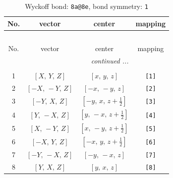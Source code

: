 \documentclass[fleqn,8pt]{jsarticle}
\begin{document}
\begin{longtable}{cccc}
\caption{Wyckoff bond: {\tt 8a@8e}, bond symmetry: {\tt 1}}
 \\
 \hline \hline
No. & vector & center & mapping \\ \hline \endfirsthead

\multicolumn{3}{l}{\tablename\ \thetable{}} \\
 \hline \hline
No. & vector & center & mapping \\ \hline \endhead

 \hline \hline
\multicolumn{3}{r}{\footnotesize\it continued ...} \\ \endfoot

 \hline \hline
\multicolumn{3}{r}{} \\ \endlastfoot

1 & $\left[ X,\, Y,\, Z \right]$ & $\left[ x,\, y,\, z \right]$ & {\tt [1]} \\ \hline
2 & $\left[ - X,\, - Y,\, Z \right]$ & $\left[ - x,\, - y,\, z \right]$ & {\tt [2]} \\ \hline
3 & $\left[ - Y,\, X,\, Z \right]$ & $\left[ - y,\, x,\, z + \frac{1}{2} \right]$ & {\tt [3]} \\ \hline
4 & $\left[ Y,\, - X,\, Z \right]$ & $\left[ y,\, - x,\, z + \frac{1}{2} \right]$ & {\tt [4]} \\ \hline
5 & $\left[ X,\, - Y,\, Z \right]$ & $\left[ x,\, - y,\, z + \frac{1}{2} \right]$ & {\tt [5]} \\ \hline
6 & $\left[ - X,\, Y,\, Z \right]$ & $\left[ - x,\, y,\, z + \frac{1}{2} \right]$ & {\tt [6]} \\ \hline
7 & $\left[ - Y,\, - X,\, Z \right]$ & $\left[ - y,\, - x,\, z \right]$ & {\tt [7]} \\ \hline
8 & $\left[ Y,\, X,\, Z \right]$ & $\left[ y,\, x,\, z \right]$ & {\tt [8]} \\
\end{longtable}
\end{document}
